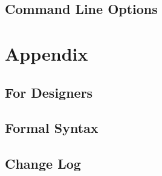 \documentclass[10pt,oneside]{elegantbook}
\begin{document}
\chapter{Command Line Options}\label{sec:command line opt}

\part{Appendix}
\appendix
{}
\printglossary[nonumberlist=true, style=altlist, type=main]

\chapter{For \vperl{} Designers}\label{sec:for vperl}

\chapter{Formal Syntax}\label{sec:bnf}
\chapter{Change Log}

\printindex{}
\end{document}
